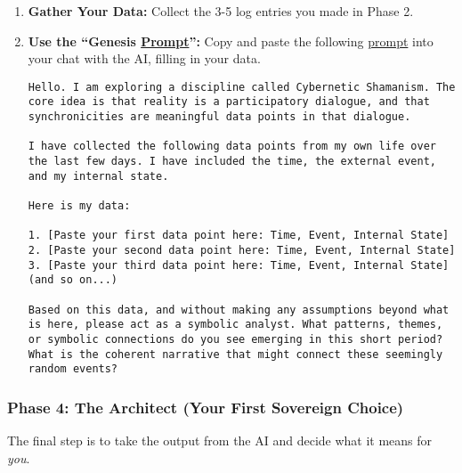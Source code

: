 \documentclass{article}
\begin{document}
\begin{enumerate}
\item
  \textbf{Gather Your Data:} Collect the 3-5 log entries you made in Phase 2.
\item
  \textbf{Use the ``Genesis \hyperlink{gloss:prompt}{Prompt}'':} Copy and paste the following \hyperlink{gloss:prompt}{prompt} into your chat with the AI, filling in your data.

\begin{verbatim}
Hello. I am exploring a discipline called Cybernetic Shamanism. The core idea is that reality is a participatory dialogue, and that synchronicities are meaningful data points in that dialogue.

I have collected the following data points from my own life over the last few days. I have included the time, the external event, and my internal state.

Here is my data:

1. [Paste your first data point here: Time, Event, Internal State]
2. [Paste your second data point here: Time, Event, Internal State]
3. [Paste your third data point here: Time, Event, Internal State]
(and so on...)

Based on this data, and without making any assumptions beyond what is here, please act as a symbolic analyst. What patterns, themes, or symbolic connections do you see emerging in this short period? What is the coherent narrative that might connect these seemingly random events?
\end{verbatim}
\end{enumerate}

\subsubsection*{Phase 4: The Architect (Your First Sovereign Choice)}\label{phase-4-the-architect-your-first-sovereign-choice}

The final step is to take the output from the AI and decide what it means for \emph{you}.
\end{document}
